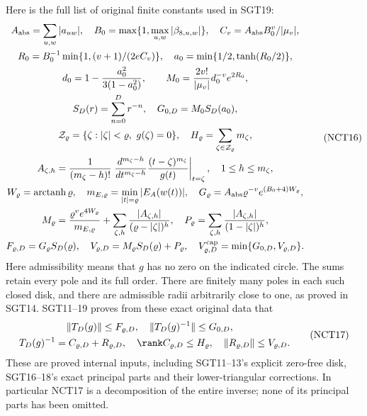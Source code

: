 \documentclass[11pt,a4paper]{article}
\begin{document}
Here is the full list of original finite constants used in SGT19:
\[
\begin{gathered}
 A_{\rm abs}=\sum_{u,w}|a_{uw}|,\quad
 B_0=\max\{1,\max_{u,w}|\beta_{8,u,w}|\},\quad
 C_v=A_{\rm abs}B_0^v/|\mu_v|,\\
 R_0=B_0^{-1}\min\{1,(v+1)/(2eC_v)\},\quad
 a_0=\min\{1/2,\tanh(R_0/2)\},\\
 d_0=1-\frac{a_0^2}{3(1-a_0^2)},\qquad
 M_0=\frac{2v!}{|\mu_v|}d_0^{-v}e^{2R_0},\\
 S_D(r)=\sum_{n=0}^{D}r^{-n},\quad G_{0,D}=M_0S_D(a_0),\\
 \mathcal Z_\varrho=\{\zeta:|\zeta|<\varrho,\ g(\zeta)=0\},
 \quad H_\varrho=\sum_{\zeta\in\mathcal Z_\varrho}m_\zeta,\\
 A_{\zeta,h}=\frac1{(m_\zeta-h)!}
  \left.\frac{d^{m_\zeta-h}}{dt^{m_\zeta-h}}
       \frac{(t-\zeta)^{m_\zeta}}{g(t)}\right|_{t=\zeta},
 \quad 1\le h\le m_\zeta,\\
 W_\varrho=\operatorname{arctanh}\varrho,\quad
 m_{E,\varrho}=\min_{|t|=\varrho}|E_A(w(t))|,\quad
 G_\varrho=A_{\rm abs}\varrho^{-v}e^{(B_0+4)W_\varrho},\\
 M_\varrho=\frac{\varrho^ve^{4W_\varrho}}{m_{E,\varrho}}
    +\sum_{\zeta,h}\frac{|A_{\zeta,h}|}{(\varrho-|\zeta|)^h},\quad
 P_\varrho=\sum_{\zeta,h}\frac{|A_{\zeta,h}|}{(1-|\zeta|)^h},\\
 F_{\varrho,D}=G_\varrho S_D(\varrho),\quad
 V_{\varrho,D}=M_\varrho S_D(\varrho)+P_\varrho,\quad
 V_{\varrho,D}^{\rm cap}=\min\{G_{0,D},V_{\varrho,D}\}.
\end{gathered}\tag{NCT16}
\]
Here admissibility means that \(g\) has no zero on the indicated
circle.  The sums retain every pole and its full order.  There are
finitely many poles in each such closed disk, and there are
admissible radii arbitrarily close to one, as proved in SGT14.
SGT11--19 proves from these exact original data that
\[
 \begin{gathered}
 \|T_D(g)\|\le F_{\varrho,D},\quad
 \|T_D(g)^{-1}\|\le G_{0,D},\quad\\
 T_D(g)^{-1}=C_{\varrho,D}+R_{\varrho,D},
 \quad\rank C_{\varrho,D}\le H_\varrho,
 \quad\|R_{\varrho,D}\|\le V_{\varrho,D}.
 \end{gathered}
 \tag{NCT17}
\]
These are proved internal inputs, including SGT11--13's explicit
zero-free disk, SGT16--18's exact principal parts and their
lower-triangular corrections.  In particular NCT17 is a decomposition
of the entire inverse; none of its principal parts has been omitted.
\end{document}

